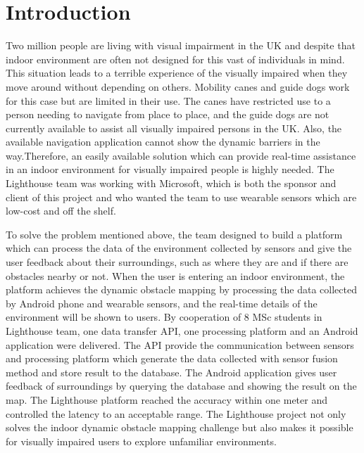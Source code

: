 \documentclass[prodmode,acmtosem]{acmsmall} %
\begin{document}



\maketitle

\section{Introduction}

Two million people are living with visual impairment in the UK and despite that indoor environment are often not designed for this vast of individuals in mind. This situation leads to a terrible experience of the visually impaired when they move around without depending on others. Mobility canes and guide dogs work for this case but are limited in their use. The canes have restricted use to a person needing to navigate from place to place, and the guide dogs are not currently available to assist all visually impaired persons in the UK. Also, the available navigation application cannot show the dynamic barriers in the way.Therefore, an easily available solution which can provide real-time assistance in an indoor environment for visually impaired people is highly needed. The Lighthouse team was working with Microsoft, which is both the sponsor and client of this project and who wanted the team to use wearable sensors which are low-cost and off the shelf.

To solve the problem mentioned above, the team designed to build a platform which can process the data of the environment collected by sensors and give the user feedback about their surroundings, such as where they are and if there are obstacles nearby or not. When the user is entering an indoor environment, the platform achieves the dynamic obstacle mapping by processing the data collected by Android phone and wearable sensors, and the real-time details of the environment will be shown to users.
By cooperation of 8 MSc students in Lighthouse team, one data transfer API, one processing platform and an Android application were delivered. The API provide the communication between sensors and processing platform which generate the data collected with sensor fusion method and store result to the database. The Android application gives user feedback of surroundings by querying the database and showing the result on the map.
The Lighthouse platform reached the accuracy within one meter and controlled the latency to an acceptable range. The Lighthouse project not only solves the indoor dynamic obstacle mapping challenge but also makes it possible for visually impaired users to explore unfamiliar environments.
\end{document}
